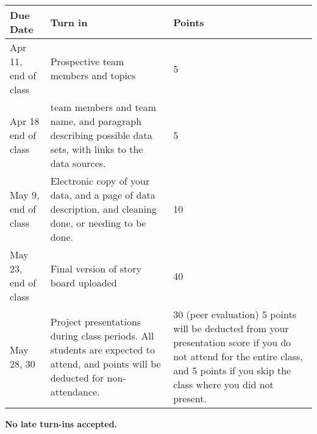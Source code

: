 \documentclass{article}
\begin{document}
\begin{center}
\bigskip
\begin{tabular}{|p{2cm}|p{8cm}|p{5cm}|}\hline
  {\bf Due Date} & {\bf Turn in}  & {\bf Points} \\\hline
Apr 11, end of class & Prospective team members and topics & 5 \\
Apr 18 end of class & team members and team name, and paragraph describing possible data sets, with links to the data sources.  & 5\\\hline
May 9, end of class & Electronic copy of your data, and a page of data description, and cleaning done, or needing to be done. & 10 \\\hline
May 23, end of class & Final version of story board uploaded & 40 \\\hline
May  28, 30 & Project presentations during class periods. All students are expected to attend, and points will be deducted for non-attendance. & 30 (peer evaluation) 5 points will be deducted from your presentation score if you do not attend for the entire class, and 5 points if you skip the class where you did not present. \\\hline
\end{tabular}
\end{center}
\bigskip

{\bf No late turn-ins accepted.}
\end{document}
